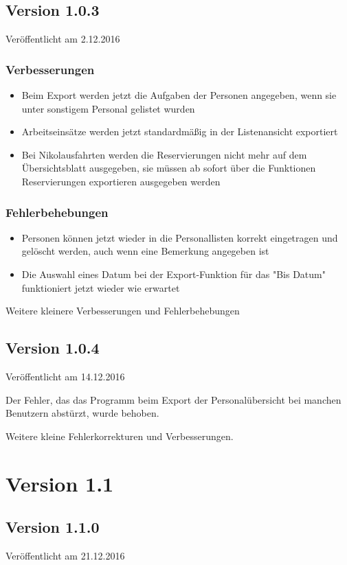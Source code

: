 \subsection{Version 1.0.3}
Veröffentlicht am 2.12.2016
\subsubsection{Verbesserungen}
\begin{itemize}
  \item
  Beim Export werden jetzt die Aufgaben der Personen angegeben, wenn sie unter sonstigem Personal gelistet wurden
  \item
  Arbeitseinsätze werden jetzt standardmäßig in der Listenansicht exportiert
  \item
  Bei Nikolausfahrten werden die Reservierungen nicht mehr auf dem Übersichtsblatt ausgegeben, sie müssen ab sofort über die Funktionen Reservierungen exportieren ausgegeben werden
\end{itemize}

\subsubsection{Fehlerbehebungen}
\begin{itemize}
  \item
  Personen können jetzt wieder in die Personallisten korrekt eingetragen und gelöscht werden, auch wenn eine Bemerkung angegeben ist
  \item
  Die Auswahl eines Datum bei der Export-Funktion für das "Bis Datum" funktioniert jetzt wieder wie erwartet
\end{itemize}
Weitere kleinere Verbesserungen und Fehlerbehebungen


\subsection{Version 1.0.4}
Veröffentlicht am 14.12.2016

Der Fehler, das das Programm beim Export der Personalübersicht bei manchen Benutzern abstürzt, wurde behoben.

Weitere kleine Fehlerkorrekturen und Verbesserungen.



\section{Version 1.1}
\subsection{Version 1.1.0}
Veröffentlicht am 21.12.2016
